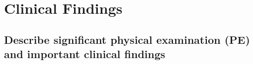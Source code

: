 \section{Clinical Findings}
\subsection{Describe significant physical examination (PE) and important clinical findings}